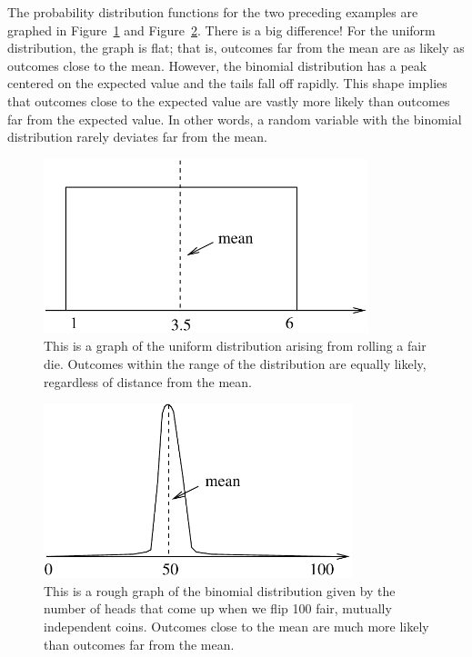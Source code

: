 The probability distribution functions for the two preceding examples
are graphed in Figure~\ref{fig:uniform} and Figure~\ref{fig:binom2}.
There is a big difference!  For the uniform distribution, the graph is
flat; that is, outcomes far from the mean are as likely as outcomes
close to the mean.  However, the binomial distribution has a peak
centered on the expected value and the tails fall off rapidly.  This
shape implies that outcomes close to the expected value are vastly
more likely than outcomes far from the expected value.  In other
words, a random variable with the binomial distribution rarely
deviates far from the mean.
\begin{figure}
  \centerline{\includegraphics[height=2in]{figures/uniform}}
  \caption{This is a graph of the uniform distribution arising from
    rolling a fair die.  Outcomes within the range of the distribution
    are equally likely, regardless of distance from the mean.}
  \label{fig:uniform}
\end{figure}
\begin{figure}
  \centerline{\includegraphics[height=2in]{figures/binom2}}
  \caption{This is a rough graph of the binomial distribution given by
    the number of heads that come up when we flip 100 fair, mutually
    independent coins.  Outcomes close to the mean are much more
    likely than outcomes far from the mean.}
  \label{fig:binom2}
\end{figure}

